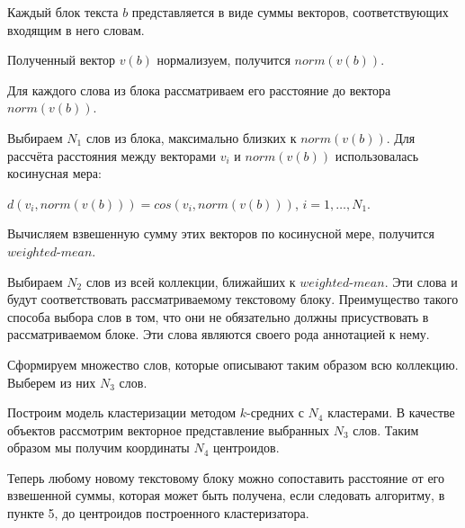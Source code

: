 \documentclass[12pt]{article}
\begin{document}
\par\begin{enumerate}{
		\vspace{-0.2cm}\item Каждый блок текста	$b$ представляется в виде суммы векторов, соответствующих входящим в него словам.
		\vspace{-0.2cm}\item Полученный вектор $v(b)$ нормализуем, получится $norm(v(b))$.
		\vspace{-0.2cm}\item Для каждого слова из блока рассматриваем его расстояние до вектора $norm(v(b))$.
		\vspace{-0.2cm}\item Выбираем $N_1$ слов из блока, максимально близких к $norm(v(b))$. Для рассчёта расстояния между векторами $v_i$ и $norm(v(b))$ использовалась косинусная мера: 
		
		$d(v_i,norm(v(b))) = cos(v_i,norm(v(b)))$,\hspace{0.5cm} $i = 1, \ldots, N_1.$
		
		\vspace{-0.2cm}\item Вычисляем взвешенную сумму этих векторов по косинусной мере, получится $weighted$-$mean$.
		\vspace{-0.2cm}\item Выбираем $N_2$ слов из всей коллекции, ближайших к $weighted$-$mean$. Эти слова и будут соответствовать рассматриваемому текстовому блоку.  Преимущество такого способа выбора слов в том, что они не обязательно должны присуствовать в рассматриваемом блоке. Эти слова являются своего рода аннотацией к нему.
		\vspace{-0.2cm}\item Сформируем множество слов, которые описывают таким образом всю коллекцию. Выберем из них $N_3$ слов.
		\vspace{-0.2cm}\item Построим модель кластеризации методом $k$-средних с $N_4$ кластерами. В качестве объектов рассмотрим векторное представление выбранных $N_3$ слов. Таким образом мы получим координаты $N_4$ центроидов.
		\vspace{-0.2cm}\item Теперь любому новому текстовому блоку можно сопоставить расстояние от его взвешенной суммы, которая может быть получена, если следовать алгоритму, в пункте 5, до центроидов построенного кластеризатора. 
}\end{enumerate}
\end{document}
